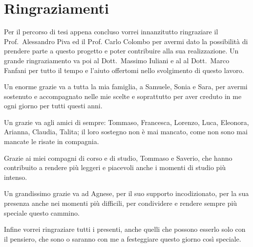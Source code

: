\chapter*{Ringraziamenti}

Per il percorso di tesi appena concluso vorrei innanzitutto ringraziare il Prof.~Alessandro Piva ed il Prof. Carlo Colombo per avermi dato la possibilità di prendere parte a questo progetto e poter contribuire alla sua realizzazione. Un grande ringraziamento va poi al Dott.~Massimo Iuliani e al al Dott.~Marco Fanfani per tutto il tempo e l'aiuto offertomi nello svolgimento di questo lavoro.

Un enorme grazie va a tutta la mia famiglia, a Samuele, Sonia e Sara, per avermi sostenuto e accompagnato nelle mie scelte e soprattutto per aver creduto in me ogni giorno per tutti questi anni.

Un grazie va agli amici di sempre: Tommaso, Francesca, Lorenzo, Luca, Eleonora, Arianna, Claudia, Talita; il loro sostegno non è mai mancato, come non sono mai mancate le risate in compagnia.

Grazie ai miei compagni di corso e di studio, Tommaso e Saverio, che hanno contribuito a rendere più leggeri e piacevoli anche i momenti di studio più intenso.

Un grandissimo grazie va ad Agnese, per il suo supporto incodizionato, per la sua presenza anche nei momenti più difficili, per condividere e rendere sempre più speciale questo cammino.

Infine vorrei ringraziare tutti i presenti, anche quelli che possono esserlo solo con il pensiero, che sono o saranno con me a festeggiare questo giorno così speciale.